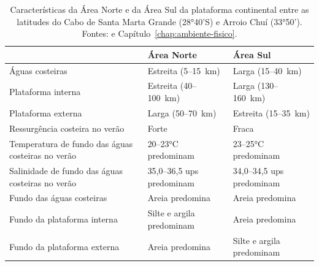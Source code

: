\documentclass[a4paper,11pt,twoside,showtrims,onecolumn,openright,final]{memoir}
\begin{document}
\begin{table}
\caption[Características da Área Norte e da Área Sul da plataforma continental entre as latitudes
         do Cabo de Santa Marta Grande e Arroio Chuí]
        {Características da Área Norte e da Área Sul da plataforma continental entre as latitudes
         do Cabo de Santa Marta Grande (28°40'S) e Arroio Chuí (33°50').
	 Fontes: \citet{correa1977} e Capítulo~\ref{chap:ambiente-fisico}.} %
\label{tab:caracteristicas-plataforma}	 
\begin{footnotesize}
\begin{tabularx}{\textwidth}{XXX}
\toprule
							& Área Norte 				& Área Sul  			\\
\midrule
Águas costeiras 					& Estreita (5--15~km)			& Larga (15--40~km)			\\
\addlinespace
Plataforma interna					& Estreita (40--100~km)			& Larga (130--160~km)			\\
\addlinespace
Plataforma externa					& Larga (50--70~km)			& Estreita (15--35~km)		\\
\addlinespace
Ressurgência costeira no verão				& Forte					& Fraca				\\
\addlinespace
Temperatura de fundo 
das águas costeiras no verão				& 20--23°C predominam			& 23--25°C predominam		\\	
\addlinespace
Salinidade de fundo 
das águas costeiras no verão				& 35,0--36,5 ups predominam		& 34,0--34,5 ups predominam	\\
\addlinespace
Fundo das águas costeiras				& Areia predomina			& Areia predomina		\\
\addlinespace
Fundo da plataforma interna				& Silte e argila predominam		& Areia predomina		\\
\addlinespace
Fundo da plataforma externa				& Areia predomina			& Silte e argila predominam	\\
\bottomrule
\end{tabularx}
\end{footnotesize}
\end{table}

\end{document}
